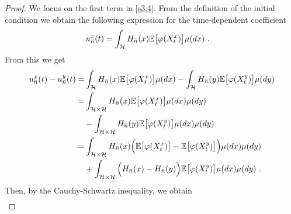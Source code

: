 \documentclass[review,onefignum,onetabnum]{siamart190516}
\begin{document}
\begin{proof}
            We focus on the first term in \eqref{s3.4}. From the definition of 
            the
        initial condition we obtain the following expression for
        the time-dependent coefficient
        \begin{align*}
          u_{\bar n}^x(t) &=
            \int_{\mathcal{H}} H_{\bar n}(x) \mathbb{E}\big[\varphi(X_t^x)\big] \mu(dx) 
            \ .
        \end{align*}
        From this we get
        \begin{align*}
            u_{\bar n}^x(t)-u_{\bar n}^y(t)
                =&
                \int_{\mathcal{H}} H_{\bar n}(x)
                    \mathbb{E}\big[
                        \varphi(X_t^x)
                    \big]
                    \mu(dx) -
                    \int_{\mathcal{H}} H_{\bar n}(y)
                    \mathbb{E}\big[
                        \varphi(X_t^y)
                    \big] \mu(dy)
                \\
                =&
                \int_{\mathcal{H} \times \mathcal{H}} H_{\bar n}(x)
                    \mathbb{E}\big[
                        \varphi(X_t^x)
                    \big] \mu(dx)\mu(dy)
                \\
                &-
                     \int_{\mathcal{H}\times \mathcal{H}} H_{\bar n}(y)
                        \mathbb{E}\big[
                            \varphi(X_t^y)
                        \big]
                    \mu(dx)\mu(dy)
                \\
                =&
                \int_{\mathcal{H}\times \mathcal{H}} H_{\bar n}(x)
                    \Big(
                        \mathbb{E}\big[
                            \varphi(X_t^x)
                        \big]
                        -
                        \mathbb{E}\big[
                            \varphi(X_t^y)
                        \big]
                    \Big)
                    \mu(dx)\mu(dy)
                \\
                &+
                \int_{\mathcal{H}\times \mathcal{H}}
                    \Big(
                        H_{\bar n}(x) - H_{\bar n}(y)
                    \Big)
                    \mathbb{E}\big[
                        \varphi(X_t^y)
                    \big] \mu(dx) \mu(dy) \ .
        \end{align*}
        Then, by the Cauchy-Schwartz inequality, we obtain
        \begin{equation}
            \begin{aligned}

\end{aligned}
\end{equation}
\end{proof}
\end{document}

